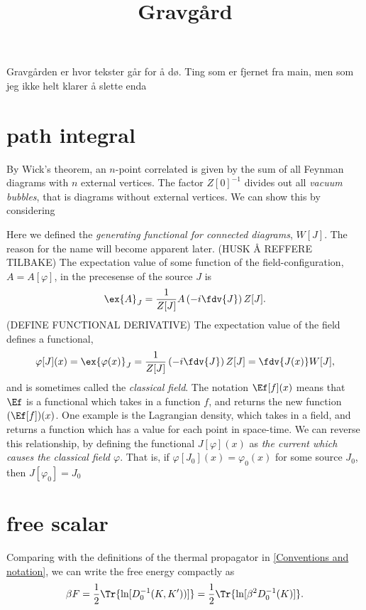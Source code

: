 \documentclass{article}
\title{Gravgård}
\date{}
\begin{document}
    \maketitle
    Gravgården er hvor tekster går for å dø. Ting som er fjernet fra main, men som jeg ikke helt klarer å slette enda
    \section{path integral}
    By Wick's theorem, an $n$-point correlated is given by the sum of all Feynman diagrams with $n$ external vertices.
    The factor $Z[0]^{-1}$ divides out all \emph{vacuum bubbles}, that is diagrams without external vertices.
    We can show this by considering 

    Here we defined the \emph{generating functional for connected diagrams}, $W[J]$.
    The reason for the name will become apparent later. (HUSK Å REFFERE TILBAKE)
    The expectation value of some function of the field-configuration, $A = A[\varphi]$, in the precesense of the source $J$ is
    \begin{equation}
        \ex{A}_J = \frac{1}{Z[J]} A\left( -i  \fdv{J}\right) Z[J].
    \end{equation}
    (DEFINE FUNCTIONAL DERIVATIVE)
    The expectation value of the field defines a functional,
    \begin{equation}
        \label{calssical field functional}
        \varphi[J](x) = \ex{\varphi(x)}_J = 
        \frac{1}{Z[J]} \left( -i  \fdv{J}\right) Z[J]
        = \fdv{J(x)} W[J],
    \end{equation}
    and is sometimes called the \emph{classical field}.
    The notation $\Ef[f](x)$ means that $\Ef$ is a functional which takes in a function $f$, and returns the new function $(\Ef[f])(x)$.
    One example is the Lagrangian density, which takes in a field, and returns a function which has a value for each point in space-time.
    We can reverse this relationship, by defining the functional $J[\varphi](x)$ as \emph{the current which causes the classical field $\varphi$}.
    That is, if $\varphi[J_0](x) = \varphi_0(x)$ for some source $J_0$, then $J[\varphi_0] = J_0$

\section{free scalar}
    Comparing with the definitions of the thermal propagator in \autoref{Conventions and notation}, we can write the free energy compactly as
    \begin{equation}
        \label{free energy from propagator}
        \beta F = \frac{1}{2} \Tr{\ln[D_0^{-1}(K, K'))]} 
        = \frac{1}{2} \Tr{\ln[\beta^2 D_0^{-1}(K)]}.
    \end{equation}
\end{document}
